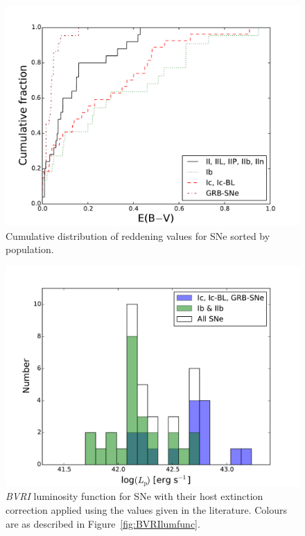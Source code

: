 \documentclass[a4paper,fleqn,usenatbib]{mnras}
\begin{document}
\begin{figure}
\centering
\includegraphics[scale=0.4]{cum_dist_fin.pdf}
\caption{Cumulative distribution of reddening values for SNe sorted by population.}
\label{fig:cumdist1}
\end{figure}

%

\begin{figure}
\centering
\includegraphics[scale=0.4]{BVRI_luminosity_function-knownE.pdf}
\caption{\textit{BVRI} luminosity function for SNe with their host extinction correction applied using the values given in the literature. Colours are as described in Figure~\ref{fig:BVRIlumfunc}.}
\label{fig:test1}
\end{figure}
\end{document}
